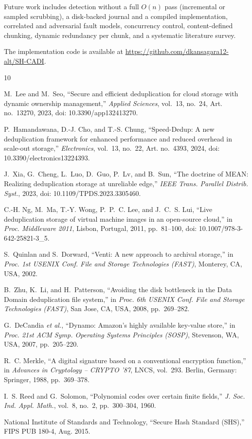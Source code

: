 \documentclass[conference]{IEEEtran}
\begin{document}
Future work includes detection without a full $O(n)$ pass (incremental or sampled scrubbing), a disk-backed journal and a compiled implementation, correlated and adversarial fault models, concurrency control, content-defined chunking, dynamic redundancy per chunk, and a systematic literature survey.

The implementation code is available at \url{https://github.com/dkansagara12-alt/SH-CADI}.

\begin{thebibliography}{10}

M.~Lee and M.~Seo, ``Secure and efficient deduplication for cloud storage with dynamic ownership management,'' \emph{Applied Sciences}, vol.~13, no.~24, Art. no.~13270, 2023, doi: 10.3390/app132413270.

P.~Hamandawana, D.-J. Cho, and T.-S. Chung, ``Speed-Dedup: A new deduplication framework for enhanced performance and reduced overhead in scale-out storage,'' \emph{Electronics}, vol.~13, no.~22, Art. no.~4393, 2024, doi: 10.3390/electronics13224393.

J.~Xia, G.~Cheng, L.~Luo, D.~Guo, P.~Lv, and B.~Sun, ``The doctrine of MEAN: Realizing deduplication storage at unreliable edge,'' \emph{IEEE Trans. Parallel Distrib. Syst.}, 2023, doi: 10.1109/TPDS.2023.3305460.

C.-H. Ng, M.~Ma, T.-Y. Wong, P.~P.~C. Lee, and J.~C.~S. Lui, ``Live deduplication storage of virtual machine images in an open-source cloud,'' in \emph{Proc. Middleware 2011}, Lisbon, Portugal, 2011, pp.~81--100, doi: 10.1007/978-3-642-25821-3\_5.

S.~Quinlan and S.~Dorward, ``Venti: A new approach to archival storage,'' in \emph{Proc. 1st USENIX Conf. File and Storage Technologies (FAST)}, Monterey, CA, USA, 2002.

B.~Zhu, K.~Li, and H.~Patterson, ``Avoiding the disk bottleneck in the Data Domain deduplication file system,'' in \emph{Proc. 6th USENIX Conf. File and Storage Technologies (FAST)}, San Jose, CA, USA, 2008, pp.~269--282.

G.~DeCandia \emph{et al.}, ``Dynamo: Amazon's highly available key-value store,'' in \emph{Proc. 21st ACM Symp. Operating Systems Principles (SOSP)}, Stevenson, WA, USA, 2007, pp.~205--220.

R.~C. Merkle, ``A digital signature based on a conventional encryption function,'' in \emph{Advances in Cryptology -- CRYPTO '87}, LNCS, vol.~293. Berlin, Germany: Springer, 1988, pp.~369--378.

I.~S. Reed and G.~Solomon, ``Polynomial codes over certain finite fields,'' \emph{J. Soc. Ind. Appl. Math.}, vol.~8, no.~2, pp.~300--304, 1960.

National Institute of Standards and Technology, ``Secure Hash Standard (SHS),'' FIPS PUB 180-4, Aug. 2015.

\end{thebibliography}
\end{document}
